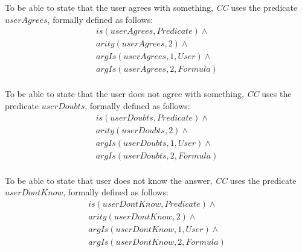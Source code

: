 \begin{definition}\label{def:userAgrees}
To be able to state that the user agrees with something, \emph{CC} uses the 
predicate $userAgrees$, formally defined as follows:
\begin{equation}\label{as:userAgrees}
\begin{gathered}
	is(userAgrees, Predicate) \land \\
	arity(userAgrees,2) \land \\
	argIs(userAgrees,1,User) \land \\
	argIs(userAgrees,2,Formula)\\
\end{gathered}
\end{equation}
\end{definition}

\begin{definition}\label{def:userDoubts}
To be able to state that the user does not agree with something, \emph{CC} uses 
the predicate $userDoubts$, formally defined as follows:
\begin{equation}\label{as:userDoubts}
\begin{gathered}
	is(userDoubts, Predicate) \land \\
	arity(userDoubts,2) \land \\
	argIs(userDoubts,1,User) \land \\
	argIs(userDoubts,2,Formula)\\
\end{gathered}
\end{equation}
\end{definition}

\begin{definition}\label{def:userDontKnow}
To be able to state that user does not know the answer, \emph{CC} uses the 
predicate $userDontKnow$, formally defined as follows:
\begin{equation}\label{as:userDontKnow}
\begin{gathered}
	is(userDontKnow, Predicate) \land \\
	arity(userDontKnow,2) \land \\
	argIs(userDontKnow,1,User) \land \\
	argIs(userDontKnow,2,Formula)\\
\end{gathered}
\end{equation}
\end{definition}


